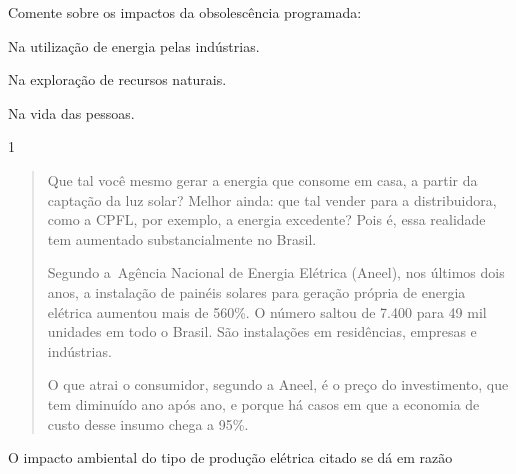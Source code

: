 Comente sobre os impactos da obsolescência programada:

\begin{escolha}
\item  Na utilização de energia pelas indústrias.



\item  Na exploração de recursos naturais.



\item Na vida das pessoas.


\end{escolha}


\num{1}

\begin{quote}
Que tal você mesmo gerar a energia que consome em casa, a
partir da captação da luz solar? Melhor ainda: que tal vender para a
distribuidora, como a CPFL, por exemplo, a energia excedente? Pois é,
essa realidade tem aumentado substancialmente no Brasil.

Segundo a~Agência Nacional de Energia Elétrica (Aneel), nos
últimos dois anos, a instalação de painéis solares para geração própria
de energia elétrica aumentou mais de 560\%. O número saltou de 7.400
para 49 mil unidades em todo o Brasil. São instalações em residências,
empresas e indústrias.

O que atrai o consumidor, segundo a Aneel, é o preço do
investimento, que tem diminuído ano após ano, e porque há casos em que a
economia de custo desse insumo chega a 95\%.

\end{quote}

O impacto ambiental do tipo de produção elétrica citado se dá em razão

